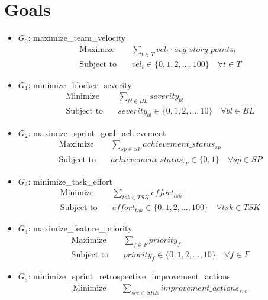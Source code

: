 \documentclass{article}
\begin{document}
\section{Goals}
\begin{itemize}
    \item $G_0$: maximize\_team\_velocity
        \begin{align*}
            \text{Maximize} \quad &\sum_{t \in T} vel_t \cdot avg\_story\_points_t \\
            \text{Subject to} \quad &vel_t \in \{0, 1, 2, ..., 100\} \quad \forall t \in T
        \end{align*}
    \item $G_1$: minimize\_blocker\_severity
        \begin{align*}
            \text{Minimize} \quad &\sum_{bl \in BL} severity_{bl} \\
            \text{Subject to} \quad &severity_{bl} \in \{0, 1, 2, ..., 10\} \quad \forall bl \in BL
        \end{align*}
    \item $G_2$: maximize\_sprint\_goal\_achievement
        \begin{align*}
            \text{Maximize} \quad &\sum_{sp \in SP} achievement\_status_{sp} \\
            \text{Subject to} \quad &achievement\_status_{sp} \in \{0, 1\} \quad \forall sp \in SP
        \end{align*}
    \item $G_3$: minimize\_task\_effort
        \begin{align*}
            \text{Minimize} \quad &\sum_{tsk \in TSK} effort_{tsk} \\
            \text{Subject to} \quad &effort_{tsk} \in \{0, 1, 2, ..., 100\} \quad \forall tsk \in TSK
        \end{align*}
    \item $G_4$: maximize\_feature\_priority
        \begin{align*}
            \text{Maximize} \quad &\sum_{f \in F} priority_f \\
            \text{Subject to} \quad &priority_f \in \{0, 1, 2, ..., 10\} \quad \forall f \in F
        \end{align*}
    \item $G_5$: minimize\_sprint\_retrospective\_improvement\_actions
        \begin{align*}
            \text{Minimize} \quad &\sum_{sre \in SRE} improvement\_actions_{sre} \\

\end{align*}
\end{itemize}
\end{document}
